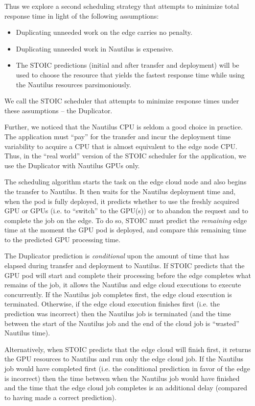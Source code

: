 Thus we explore a second scheduling strategy that attempts to minimize total response time in light of the following assumptions:
\begin{itemize}
\item Duplicating unneeded work on the edge carries no penalty.
\item Duplicating unneeded work in Nautilus is expensive.
\item The STOIC predictions (initial and after transfer and deployment) will be used to
choose the resource that yields the fastest response time while using the
Nautilus resources parsimoniously.
\end{itemize}
We call the STOIC scheduler that attempts to minimize response times under these assumptions -- the Duplicator.

Further, we noticed that the Nautilus CPU is seldom a good choice in practice. The application must ``pay'' for the transfer and incur the deployment time variability to acquire a CPU that is almost equivalent to the edge node CPU.  Thus, in the ``real world'' version of the STOIC scheduler for the application, we use the Duplicator with Nautilus GPUs only.

The scheduling algorithm starts the task on the edge cloud node and also begins the transfer to Nautilus. It then waits for the Nautilus deployment time and, when the pod is fully deployed, it predicts whether to use the freshly acquired GPU or GPUs (i.e. to ``switch'' to the GPU(s)) or to abandon the request and to complete the job on the edge.  To do so, STOIC must predict the \textit{remaining} edge time at the moment the GPU pod is deployed, and compare this remaining time to the predicted GPU processing time.  

The Duplicator prediction is \textit{conditional} upon the amount of time that has elapsed during transfer and deployment to Nautilus. If STOIC predicts that the GPU pod will start and complete their processing before the edge completes what remains of the job, it allows the Nautilus and edge cloud executions to execute concurrently. If the Nautilus job completes first, the edge cloud execution is terminated.  Otherwise, if the edge cloud execution finishes first (i.e. the prediction was incorrect) then the Nautilus job is terminated (and the time between the start of the Nautilus job and the end of the cloud job is ``wasted'' Nautilus time).

Alternatively, when STOIC predicts that the edge cloud will finish first, it returns the GPU resources to Nautilus and run only the edge cloud job. If the Nautilus job would have completed first (i.e. the conditional prediction in favor of the edge is incorrect) then the time between when the Nautilus job would have finished and the time that the edge cloud job completes is an additional delay (compared to having made a correct prediction).

